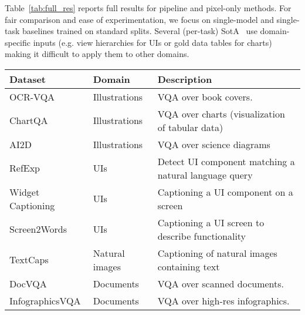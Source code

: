 \documentclass{article} \usepackage[accepted]{icml2023}
\newcommand\ourmodel{{\texttt{Pix2Struct}}}
\begin{document}
\begin{table*}[t]
\begin{tabular}{llrrrrrrrrr}
\bottomrule
\end{tabular}
\caption{Amongst single-task single-model methods,~\ourmodel~achieves state-of-the-art results on 6 out of 9 benchmarks spanning 4 domains. * indicates that the method used additional labeled data from other tasks and are not directly comparable to single task methods. VisionTaPas uses a table extraction tool. DQA-NET uses diagram processing tools for detecting arrows, blobs, etc in addition to standard OCR. UI Bert and VUT use Android view hierarchies. All other non-image methods use standard OCR.}
\label{tab:full_res}
\end{table*}

Table~\ref{tab:full_res} reports full results for pipeline and pixel-only methods. For fair comparison and ease of experimentation, we focus on single-model and single-task baselines trained on standard splits. Several (per-task) SotA~\citep{li2021vut,masry-etal-2022-chartqa} use  domain-specific inputs (e.g. view hierarchies for UIs or gold data tables for charts) making it difficult to apply them to other domains. 

\begin{table*}[b]
\renewcommand{\arraystretch}{0.9}
\centering
\begin{tabular}{l l p{8cm}}
\toprule
Dataset & Domain & Description~\\
\midrule
OCR-VQA & Illustrations & VQA over book covers.~\\
ChartQA & Illustrations & VQA over charts (visualization of tabular data)\\
AI2D & Illustrations & VQA over science diagrams\\
RefExp & UIs &  Detect UI component matching a natural language query~\\
Widget Captioning & UIs & Captioning a UI component on a screen~\\
Screen2Words & UIs & Captioning a UI screen to describe functionality\\
TextCaps  & Natural images & Captioning of natural images containing text\\
DocVQA & Documents & VQA over scanned documents.~\\
InfographicsVQA & Documents & VQA over high-res infographics.\\
\bottomrule
\end{tabular}
\caption{Summary our proposed diverse benchmark for visually-situated language understanding}
\label{tab:datasets}
\end{table*}
\end{document}
